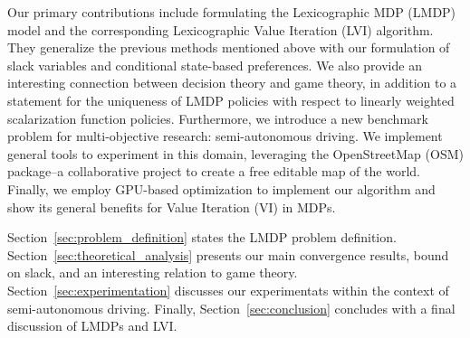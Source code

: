 
Our primary contributions include formulating the Lexicographic MDP (LMDP) model and the corresponding Lexicographic Value Iteration (LVI) algorithm. They generalize the previous methods mentioned above with our formulation of slack variables and conditional state-based preferences. We also provide an interesting connection between decision theory and game theory, in addition to a statement for the uniqueness of LMDP policies with respect to linearly weighted scalarization function policies. Furthermore, we introduce a new benchmark problem for multi-objective research: semi-autonomous driving. We implement general tools to experiment in this domain, leveraging the OpenStreetMap (OSM) package--a collaborative project to create a free editable map of the world.  Finally, we employ GPU-based optimization to implement our algorithm and show its general benefits for Value Iteration (VI) in MDPs.

Section~\ref{sec:problem_definition} states the LMDP problem definition. Section~\ref{sec:theoretical_analysis} presents our main convergence results, bound on slack, and an interesting relation to game theory. Section~\ref{sec:experimentation} discusses our experimentats within the context of semi-autonomous driving. Finally, Section~\ref{sec:conclusion} concludes with a final discussion of LMDPs and LVI.


